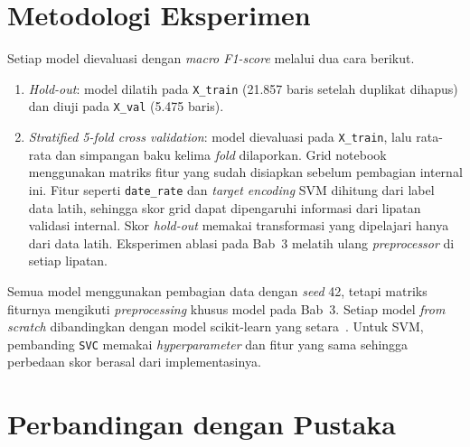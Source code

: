 \section{Metodologi Eksperimen}

Setiap model dievaluasi dengan \textit{macro F1-score} melalui dua cara berikut.
\begin{enumerate}
	\item \textit{Hold-out}: model dilatih pada \texttt{X\_train} (21.857 baris
	setelah duplikat dihapus) dan diuji pada \texttt{X\_val} (5.475 baris).
	\item \textit{Stratified 5-fold cross validation}: model dievaluasi pada
	\texttt{X\_train}, lalu rata-rata dan simpangan baku kelima \textit{fold}
	dilaporkan. Grid notebook menggunakan matriks fitur yang sudah disiapkan
	sebelum pembagian internal ini. Fitur seperti \texttt{date\_rate} dan
	\textit{target encoding} SVM dihitung dari label data latih, sehingga
	skor grid dapat dipengaruhi informasi dari lipatan validasi internal. Skor \textit{hold-out} memakai transformasi
	yang dipelajari hanya dari data latih. Eksperimen ablasi pada Bab~3
	melatih ulang \textit{preprocessor} di setiap lipatan.
\end{enumerate}
Semua model menggunakan pembagian data dengan \textit{seed} 42, tetapi matriks
fiturnya mengikuti \textit{preprocessing} khusus model pada Bab~3. Setiap model
\textit{from scratch} dibandingkan dengan model scikit-learn yang
setara~\cite{sklearn2026docs}. Untuk SVM, pembanding \texttt{SVC} memakai
\textit{hyperparameter} dan fitur yang sama sehingga perbedaan skor berasal dari
implementasinya.

\section{Perbandingan dengan Pustaka}

